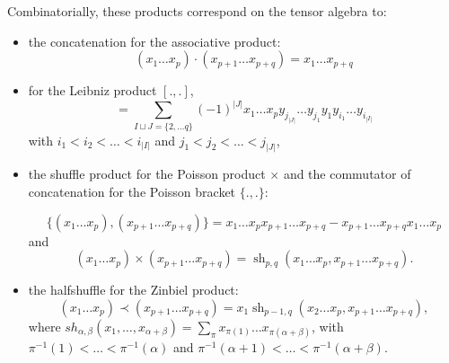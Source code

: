 \documentclass[11pt,leqno]{amsart}
\theoremstyle{definition}
\theoremstyle{plain}
\begin{document}
Combinatorially, these products correspond on the tensor algebra to:
\begin{itemize}
\item the concatenation for the associative product: 
\begin{equation*}
(x_1 \ldots x_p) \cdot (x_{p+1} \ldots x_{p+q}) = x_1 \ldots x_{p+q}
\end{equation*}

\item for the Leibniz product $[.,.]$, 
\begin{equation*}
[x_1 \ldots x_p, y_1, \ldots y_q] = \sum_{I \sqcup J =\{2, \ldots q\}} (-1)^{|J|} x_1 \ldots x_p y_{j_{|J|}} \ldots y_{j_1} y_1 y_{i_1} \ldots y_{i_{|I|}}
\end{equation*}
with $i_1<i_2< \ldots <i_{|I|}$ and $j_1<j_2<\ldots<j_{|J|}$,

\item the shuffle product for the Poisson product $\times$ and
 the commutator of concatenation for the Poisson bracket $\lbrace . , . \rbrace$: 
 
 \begin{equation*}
 \lbrace (x_1 \ldots x_p) , (x_{p+1} \ldots x_{p+q}) \rbrace= x_1 \ldots x_px_{p+1} \ldots x_{p+q} - x_{p+1} \ldots x_{p+q}x_1 \ldots x_p
 \end{equation*}
 and
  \begin{equation*}
(x_1 \ldots x_p) \times (x_{p+1} \ldots x_{p+q}) = \operatorname{sh}_{p,q}(x_1 \ldots x_p, x_{p+1} \ldots x_{p+q}). 
 \end{equation*}

\item the halfshuffle for the Zinbiel product: 
\begin{equation*}
(x_1 \ldots x_p) \prec (x_{p+1} \ldots x_{p+q}) = x_1 \operatorname{sh}_{p-1,q}(x_2 \ldots x_p, x_{p+1} \ldots x_{p+q}),
\end{equation*}
where $sh_{\alpha, \beta}(x_1, \ldots, x_{\alpha+\beta}) = \sum_{\pi} x_{\pi(1)} \ldots x_{\pi(\alpha+\beta)}$, with $\pi^{-1}(1)< \ldots < \pi^{-1}(\alpha)$ and $\pi^{-1}(\alpha+1)< \ldots <\pi^{-1}(\alpha+\beta)$.

\end{itemize}
\end{document}
